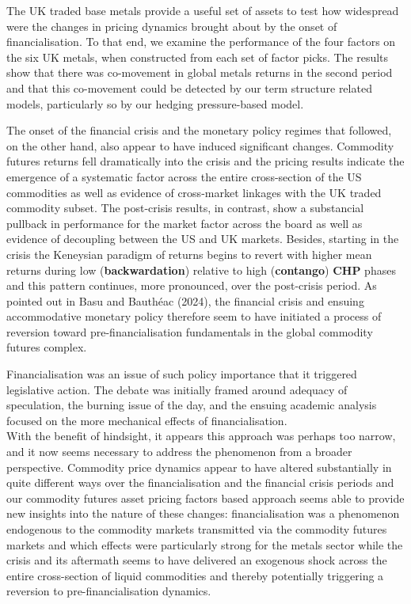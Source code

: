 \documentclass[]{elsarticle} %
\begin{document}
\medskip\setlength{\parindent}{0pt}

The UK traded base metals provide a useful set of assets to test how widespread were the changes in pricing dynamics brought about by the onset of financialisation. To that end, we examine the performance of the four factors on the six UK metals, when constructed from each set of factor picks. The results show that there was co-movement in global metals returns in the second period and that this co-movement could be detected by our term structure related models, particularly so by our hedging pressure-based model.

\medskip\setlength{\parindent}{0pt}

The onset of the financial crisis and the monetary policy regimes that followed, on the other hand, also appear to have induced significant changes. Commodity futures returns fell dramatically into the crisis and the pricing results indicate the emergence of a systematic factor across the entire cross-section of the US commodities as well as evidence of cross-market linkages with the UK traded commodity subset. The post-crisis results, in contrast, show a substancial pullback in performance for the market factor across the board as well as evidence of decoupling between the US and UK markets. Besides, starting in the crisis the Keneysian paradigm of returns begins to revert with higher mean returns during low (\textbf{backwardation}) relative to high (\textbf{contango}) \textbf{CHP} phases and this pattern continues, more pronounced, over the post-crisis period. As pointed out in Basu and Bauthéac (2024), the financial crisis and ensuing accommodative monetary policy therefore seem to have initiated a process of reversion toward pre-financialisation fundamentals in the global commodity futures complex.

\bigskip\bigskip\setlength{\parindent}{0pt}

Financialisation was an issue of such policy importance that it triggered legislative action. The debate was initially framed around adequacy of speculation, the burning issue of the day, and the ensuing academic analysis focused on the more mechanical effects of financialisation.\\
With the benefit of hindsight, it appears this approach was perhaps too narrow, and it now seems necessary to address the phenomenon from a broader perspective. Commodity price dynamics appear to have altered substantially in quite different ways over the financialisation and the financial crisis periods and our commodity futures asset pricing factors based approach seems able to provide new insights into the nature of these changes: financialisation was a phenomenon endogenous to the commodity markets transmitted via the commodity futures markets and which effects were particularly strong for the metals sector while the crisis and its aftermath seems to have delivered an exogenous shock across the entire cross-section of liquid commodities and thereby potentially triggering a reversion to pre-financialisation dynamics.
\end{document}

